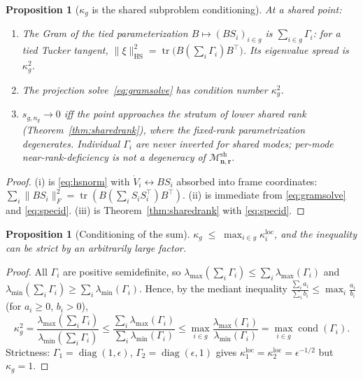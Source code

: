 \documentclass[11pt]{article}
\newtheorem{proposition}[theorem]{Proposition}
\theoremstyle{definition}
\theoremstyle{remark}
\newcommand{\tr}{\operatorname{tr}}
\newcommand{\lammax}{\lambda_{\max}}
\newcommand{\lammin}{\lambda_{\min}}
\newcommand{\HS}{\mathrm{HS}}
\newcommand{\cond}{\operatorname{cond}}
\newcommand{\diag}{\operatorname{diag}}
\newcommand{\Msh}{\mathcal{M}^{\mathrm{sh}}_{\boldsymbol{n},\boldsymbol{r}}}
\begin{document}
\begin{proposition}[$\kappa_g$ is the shared subproblem conditioning]
\label{prop:kappa}
At a shared point:
\begin{enumerate}[label=(\roman*),itemsep=1pt,topsep=2pt]
\item The Gram of the tied parameterization $B \mapsto (BS_i)_{i \in g}$ is
  $\sum_{i\in g}\Gamma_i$: for a tied Tucker tangent,
  $\|\xi\|_{\HS}^2 = \tr\bigl(B (\sum_i \Gamma_i) B^\top\bigr)$. Its
  eigenvalue spread is $\kappa_g^2$.
\item The projection solve~\eqref{eq:gramsolve} has condition number
  $\kappa_g^2$.
\item $s_{g,n_g} \to 0$ iff the point approaches the stratum of lower shared
  rank (Theorem~\ref{thm:sharedrank}), where the fixed-rank parametrization
  degenerates. Individual $\Gamma_i$ are never inverted for shared modes;
  per-mode near-rank-deficiency is not a degeneracy of $\Msh$.
\end{enumerate}
\end{proposition}

\begin{proof}
(i) is \eqref{eq:hsnorm} with $\dot V_i \leftrightarrow BS_i$ absorbed into
frame coordinates: $\sum_i \|BS_i\|_F^2 = \tr(B(\sum_i S_iS_i^\top)B^\top)$.
(ii) is immediate from \eqref{eq:gramsolve} and \eqref{eq:specid}. (iii) is
Theorem~\ref{thm:sharedrank} with \eqref{eq:specid}.
\end{proof}

\begin{proposition}[Conditioning of the sum]\label{prop:mediant}
$\displaystyle \kappa_g \;\leq\; \max_{i \in g} \kappa^{\mathrm{loc}}_i$,
and the inequality can be strict by an arbitrarily large factor.
\end{proposition}

\begin{proof}
All $\Gamma_i$ are positive semidefinite, so
$\lammax(\sum_i \Gamma_i) \leq \sum_i \lammax(\Gamma_i)$ and
$\lammin(\sum_i \Gamma_i) \geq \sum_i \lammin(\Gamma_i)$. Hence, by the
mediant inequality
$\frac{\sum_i a_i}{\sum_i b_i} \leq \max_i \frac{a_i}{b_i}$
(for $a_i \ge 0$, $b_i > 0$),
\[
\kappa_g^2
= \frac{\lammax(\sum_i \Gamma_i)}{\lammin(\sum_i \Gamma_i)}
\leq \frac{\sum_i \lammax(\Gamma_i)}{\sum_i \lammin(\Gamma_i)}
\leq \max_{i \in g} \frac{\lammax(\Gamma_i)}{\lammin(\Gamma_i)}
= \max_{i \in g} \cond(\Gamma_i).
\]
Strictness: $\Gamma_1 = \diag(1, \epsilon)$, $\Gamma_2 = \diag(\epsilon, 1)$
gives $\kappa^{\mathrm{loc}}_1 = \kappa^{\mathrm{loc}}_2 = \epsilon^{-1/2}$
but $\kappa_g = 1$.
\end{proof}
\end{document}
